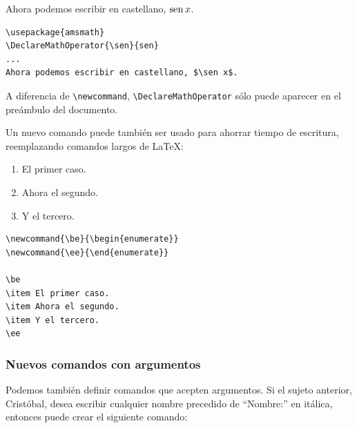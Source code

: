 {{\begin{minipage}[t]{5cm}
Ahora podemos escribir en castellano, $\sen x$.
\end{minipage}
\hspace{1.5cm}
\begin{minipage}[t]{5cm}
\begin{verbatim}
\usepackage{amsmath}
\DeclareMathOperator{\sen}{sen}
...
Ahora podemos escribir en castellano, $\sen x$.
\end{verbatim}
\end{minipage}
}
\vspace{.3cm}

A diferencia de \verb+\newcommand+, \verb+\DeclareMathOperator+ s\'olo
puede aparecer en el pre\'ambulo del documento.


Un nuevo comando puede tambi\'en ser usado para ahorrar tiempo de
escritura, reemplazando comandos largos de \LaTeX:


\vspace{.3cm}
{\small
\begin{minipage}[t]{5cm}
\newcommand{\be}{\begin{enumerate}}
\newcommand{\ee}{\end{enumerate}}

\be
\item El primer caso.
\item Ahora el segundo.
\item Y el tercero.
\ee
\end{minipage}
\hspace{1.5cm}
\begin{minipage}[t]{5cm}
\begin{verbatim}
\newcommand{\be}{\begin{enumerate}}
\newcommand{\ee}{\end{enumerate}}

\be
\item El primer caso.
\item Ahora el segundo.
\item Y el tercero.
\ee
\end{verbatim}
\end{minipage}
}
\vspace{.3cm}

\subsubsection{Nuevos comandos con argumentos}

Podemos tambi\'en definir comandos que acepten argumentos. Si el
sujeto anterior, Crist\'obal,  desea escribir cualquier nombre precedido de
``Nombre:'' en it\'alica, entonces puede crear el siguiente comando:

}
